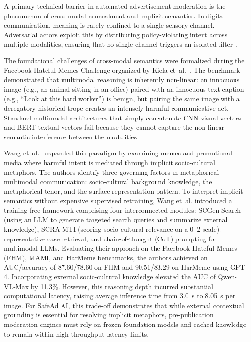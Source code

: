 \documentclass[12pt,a4paper]{report}
\begin{document}
A primary technical barrier in automated advertisement moderation is the phenomenon of cross-modal concealment and implicit semantics. In digital communication, meaning is rarely confined to a single sensory channel. Adversarial actors exploit this by distributing policy-violating intent across multiple modalities, ensuring that no single channel triggers an isolated filter~\cite{wang2025,zhuang2025,kiela2020hateful}.

The foundational challenges of cross-modal semantics were formalized during the Facebook Hateful Memes Challenge organized by Kiela et~al.~\cite{kiela2020hateful}. The benchmark demonstrated that multimodal reasoning is inherently non-linear: an innocuous image (e.g., an animal sitting in an office) paired with an innocuous text caption (e.g., ``Look at this hard worker'') is benign, but pairing the same image with a derogatory historical trope creates an intensely harmful communicative act. Standard multimodal architectures that simply concatenate CNN visual vectors and BERT textual vectors fail because they cannot capture the non-linear semantic interference between the modalities~\cite{kiela2020hateful}.

Wang et~al.~\cite{wang2025} expanded this paradigm by examining memes and promotional media where harmful intent is mediated through implicit socio-cultural metaphors. The authors identify three governing factors in metaphorical multimodal communication: socio-cultural background knowledge, the metaphorical tenor, and the surface representation pattern. To interpret implicit semantics without expensive supervised retraining, Wang et~al. introduced a training-free framework comprising four interconnected modules: SCGen Search (using an LLM to generate targeted search queries and summarize external knowledge), SCRA-MTI (scoring socio-cultural relevance on a 0--2 scale), representative case retrieval, and chain-of-thought (CoT) prompting for multimodal LLMs. Evaluating their approach on the Facebook Hateful Memes (FHM), MAMI, and HarMeme benchmarks, the authors achieved an AUC/accuracy of 87.60/78.60 on FHM and 90.51/83.29 on HarMeme using GPT-4. Incorporating external socio-cultural knowledge elevated the AUC of Qwen-VL-Max by 11.3\%. However, this reasoning depth incurred substantial computational latency, raising average inference time from 3.0~s to 8.05~s per image. For SafeAd AI, this trade-off demonstrates that while external contextual grounding is essential for resolving implicit metaphors, pre-publication moderation engines must rely on frozen foundation models and cached knowledge to remain within high-throughput latency limits.
\end{document}
